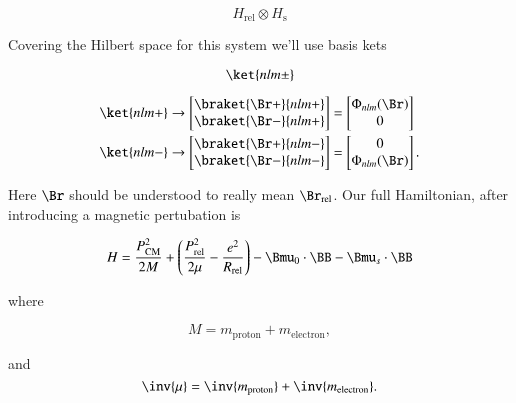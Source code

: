 \begin{equation}\label{eqn:qmTwoL16:50}
H_{\text{rel}} \otimes H_{\text{s}}
\end{equation}

Covering the Hilbert space for this system we'll use basis kets 

\begin{equation}\label{eqn:qmTwoL16:70}
\ket{nlm\pm}
\end{equation}

\begin{equation}\label{eqn:qmTwoL16:90}
\begin{aligned}
\ket{nlm+} 
&\rightarrow 
\begin{bmatrix}
\braket{\Br+}{nlm+} \\
\braket{\Br-}{nlm+} \\
\end{bmatrix}
=
\begin{bmatrix}
\Phi_{nlm}(\Br) \\
0
\end{bmatrix} \\
\ket{nlm-} 
&\rightarrow 
\begin{bmatrix}
\braket{\Br+}{nlm-} \\
\braket{\Br-}{nlm-} \\
\end{bmatrix}
=
\begin{bmatrix}
0 \\
\Phi_{nlm}(\Br) 
\end{bmatrix}.
\end{aligned}
\end{equation}

Here $\Br$ should be understood to really mean $\Br_\text{rel}$.  Our full Hamiltonian, after introducing a magnetic pertubation is

\begin{equation}\label{eqn:qmTwoL16:110}
H = 
\frac{P_\text{CM}^2}{2M} 
+ 
\left(
\frac{P_\text{rel}^2}{2\mu}
-
\frac{e^2}{R_\text{rel}}
\right)
- \Bmu_0 \cdot \BB
- \Bmu_s \cdot \BB
\end{equation}

where 

\begin{equation}\label{eqn:qmTwoL16:130}
M = m_\text{proton} + m_\text{electron},
\end{equation}

and
\begin{equation}\label{eqn:qmTwoL16:150}
\inv{\mu} = \inv{m_\text{proton}} + \inv{m_\text{electron}}.
\end{equation}

